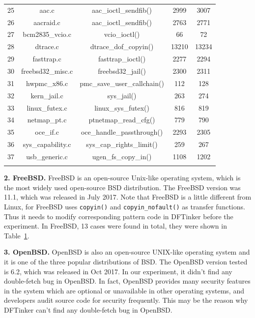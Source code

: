 \documentclass[10pt]{llncs}
\begin{document}
\begin{table}[htb!]
\begin{tabular}{ccccc}
    \hline
    25 & aac.c  & aac\_ioctl\_sendfib() & 2999 & 3007 \\
    26 & aacraid.c  & aac\_ioctl\_sendfib() & 2763 & 2771 \\
    27 & bcm2835\_vcio.c  & vcio\_ioctl() & 66 & 72 \\
    28 & dtrace.c  & dtrace\_dof\_copyin() & 13210 & 13234 \\
    29 & fasttrap.c  & fasttrap\_ioctl() & 2277 & 2294 \\
    30 & freebsd32\_misc.c  & freebsd32\_jail() & 2300 & 2311 \\
    31 & hwpmc\_x86.c  & pmc\_save\_user\_callchain() & 112 & 128 \\
    32 & kern\_jail.c  & sys\_jail() & 263 & 274 \\
    33 & linux\_futex.c  & linux\_sys\_futex() & 816 & 819 \\
    34 & netmap\_pt.c  & ptnetmap\_read\_cfg() & 779 & 790 \\
    35 & oce\_if.c  & oce\_handle\_passthrough() & 2293 & 2305 \\
    36 & sys\_capability.c  & sys\_cap\_rights\_limit() & 259 & 267 \\
    37 & usb\_generic.c  & ugen\_fs\_copy\_in() & 1108 & 1202 \\
    \hline
    \label{result}
  \end{tabular}
\end{table}


\textbf{2. FreeBSD.}
FreeBSD is an open-source Unix-like operating system, which is the most widely used open-source BSD distribution. The FreeBSD version was 11.1, which was released in July 2017. Note that FreeBSD is a little different from Linux, for FreeBSD uses \verb:copyin(): and \verb:copyin_nofault(): as transfer functions. Thus it needs to modify corresponding pattern code in DFTinker before the experiment. In FreeBSD, 13 cases were found in total, they were shown in Table~\ref{result}.



\textbf{3. OpenBSD.}
OpenBSD is also an open-source UNIX-like operating system and it is one of the three popular distributions of BSD. The OpenBSD version tested is 6.2, which was released in Oct 2017. In our experiment, it didn't find any double-fetch bug in OpenBSD. In fact, OpenBSD provides many security features in the system which are optional or unavailable in other operating systems, and developers audit source code for security frequently. This may be the reason why DFTinker can't find any double-fetch bug in OpenBSD.
\end{document}
